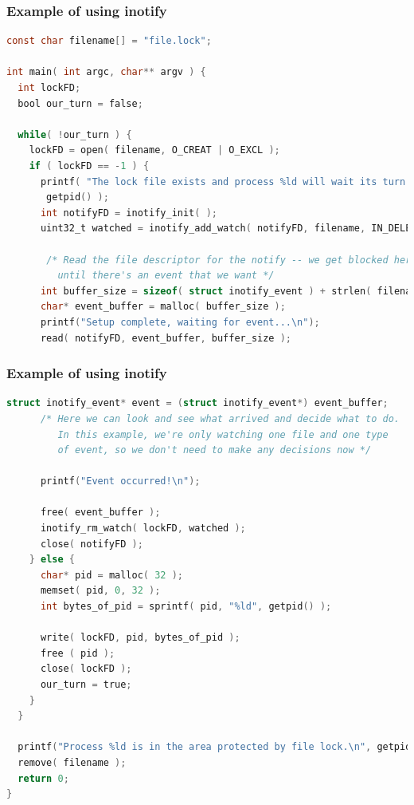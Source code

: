 \begin{frame}[fragile]
	\frametitle{Example of using inotify}

	\begin{lstlisting}[language=C]
const char filename[] = "file.lock";

int main( int argc, char** argv ) {
  int lockFD;
  bool our_turn = false;
  
  while( !our_turn ) {
    lockFD = open( filename, O_CREAT | O_EXCL );
    if ( lockFD == -1 ) {
      printf( "The lock file exists and process %ld will wait its turn...\n",
       getpid() ); 
      int notifyFD = inotify_init( );
      uint32_t watched = inotify_add_watch( notifyFD, filename, IN_DELETE_SELF );
      
       /* Read the file descriptor for the notify -- we get blocked here
         until there's an event that we want */
      int buffer_size = sizeof( struct inotify_event ) + strlen( filename ) + 1;
      char* event_buffer = malloc( buffer_size );
      printf("Setup complete, waiting for event...\n");
      read( notifyFD, event_buffer, buffer_size );

\end{lstlisting}
\end{frame}


\begin{frame}[fragile]
	\frametitle{Example of using inotify}

	\begin{lstlisting}[language=C]     
      struct inotify_event* event = (struct inotify_event*) event_buffer;
      /* Here we can look and see what arrived and decide what to do.
         In this example, we're only watching one file and one type
         of event, so we don't need to make any decisions now */

      printf("Event occurred!\n");

      free( event_buffer );
      inotify_rm_watch( lockFD, watched );
      close( notifyFD );
    } else {
      char* pid = malloc( 32 );
      memset( pid, 0, 32 );
      int bytes_of_pid = sprintf( pid, "%ld", getpid() );

      write( lockFD, pid, bytes_of_pid ); 
      free ( pid );
      close( lockFD );
      our_turn = true; 
    }
  } 

  printf("Process %ld is in the area protected by file lock.\n", getpid());
  remove( filename );
  return 0;
}
\end{lstlisting}

\end{frame}

